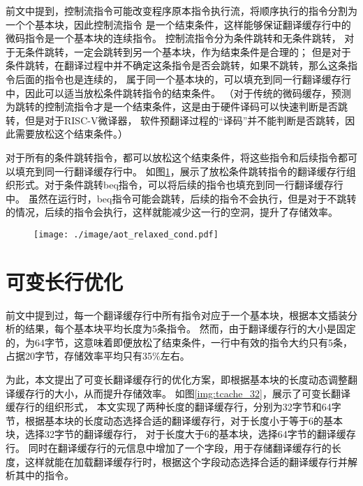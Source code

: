 前文中提到，控制流指令可能改变程序原本指令执行流，将顺序执行的指令分割为一个个基本块，因此控制流指令
是一个结束条件，这样能够保证翻译缓存行中的微码指令是一个基本块的连续指令。
控制流指令分为条件跳转和无条件跳转，
对于无条件跳转，一定会跳转到另一个基本块，作为结束条件是合理的；
但是对于条件跳转，在翻译过程中并不确定这条指令是否会跳转，如果不跳转，那么这条指令后面的指令也是连续的，
属于同一个基本块的，可以填充到同一行翻译缓存行中，因此可以适当放松条件跳转指令的结束条件。
（对于传统的微码缓存，预测为跳转的控制流指令才是一个结束条件，这是由于硬件译码可以快速判断是否跳转，但是对于RISC-V微译器，
软件预翻译过程的“译码”并不能判断是否跳转，因此需要放松这个结束条件。）

对于所有的条件跳转指令，都可以放松这个结束条件，将这些指令和后续指令都可以填充到同一行翻译缓存行中。
如图\ref{img:aot_relaxed_cond}，展示了放松条件跳转指令的翻译缓存行组织形式。对于条件跳转beq指令，可以将后续的指令也填充到同一行翻译缓存行中。
虽然在运行时，beq指令可能会跳转，后续的指令不会执行，但是对于不跳转的情况，后续的指令会执行，这样就能减少这一行的空洞，提升了存储效率。


\begin{figure}[!htbp]
    \centering
    \texttt{[image: ./image/aot\_relaxed\_cond.pdf]}
    \label{img:aot_relaxed_cond}
  \end{figure}


\section{可变长行优化}

前文中提到过，每一个翻译缓存行中所有指令对应于一个基本块，根据本文插装分析的结果，每个基本块平均长度为5条指令。
然而，由于翻译缓存行的大小是固定的，为64字节，这意味着即便放松了结束条件，一行中有效的指令大约只有5条，占据20字节，存储效率平均只有35\%左右。

为此，本文提出了可变长翻译缓存行的优化方案，即根据基本块的长度动态调整翻译缓存行的大小，从而提升存储效率。
如图\ref{img:tcache_32}，展示了可变长翻译缓存行的组织形式，
本文实现了两种长度的翻译缓存行，分别为32字节和64字节，根据基本块的长度动态选择合适的翻译缓存行，对于长度小于等于6的基本块，选择32字节的翻译缓存行，
对于长度大于6的基本块，选择64字节的翻译缓存行。
同时在翻译缓存行的元信息中增加了一个字段，用于存储翻译缓存行的长度，这样就能在加载翻译缓存行时，根据这个字段动态选择合适的翻译缓存行并解析其中的指令。

